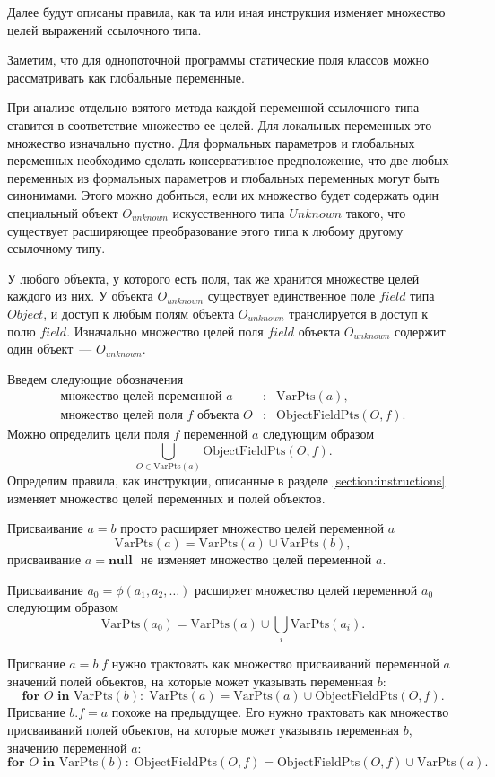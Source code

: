 \documentclass[14pt,titlepage]{extarticle}
\newcommand{\NULL}{\textbf{null }}
\newcommand{\VPts}[1]{\textrm{VarPts}(#1)}
\newcommand{\OFPts}[2]{\textrm{ObjectFieldPts}(#1, #2)}
\begin{document}
      Далее будут описаны правила, как та или иная инструкция изменяет
      множество целей выражений ссылочного типа.

      Заметим, что для однопоточной программы статические поля классов можно
      рассматривать как глобальные переменные.

      При анализе отдельно взятого метода каждой переменной ссылочного типа
      ставится в соответствие множество ее целей. Для локальных переменных
      это множество изначально пустно. Для формальных параметров и глобальных
      переменных необходимо сделать консервативное предположение, что две любых
      переменных из формальных параметров и глобальных переменных могут быть
      синонимами. Этого можно добиться, если их множество будет содержать один
      специальный объект $O_{unknown}$ искусственного типа $Unknown$ такого,
      что существует расширяющее преобразование этого типа к любому другому
      ссылочному типу.

      У любого объекта, у которого есть поля, так же хранится множестве целей
      каждого из них. У объекта $O_{unknown}$ существует единственное поле
      $field$ типа $Object$, и доступ к любым полям объекта $O_{unknown}$
      транслируется в доступ к полю $field$. Изначально множество целей
      поля $field$ объекта $O_{unknown}$ содержит один объект~---
      $O_{unknown}$.

      Введем следующие обозначения
      \begin{eqnarray*}
        \textrm{множество целей переменной $a$}&:& \VPts{a}, \\
        \textrm{множество целей поля $f$ объекта $O$}&:& \OFPts{O}{f}.
      \end{eqnarray*}
      Можно определить цели поля $f$ переменной $a$ следующим образом
      \[ \bigcup\limits_{O \in \VPts{a}} \OFPts{O}{f}.\]
      Определим правила, как инструкции, описанные в разделе
      \ref{section:instructions} изменяет множество целей переменных и полей
      объектов.

      Присваивание $a = b$ просто расширяет множество целей переменной $a$
      \[\VPts{a} = \VPts{a} \cup \VPts{b},\]
      присваивание $a = \NULL$ не изменяет множество целей переменной $a$.

      Присваивание $a_0 = \phi(a_1, a_2, \ldots)$ расширяет множество целей
      переменной $a_0$ следующим образом
      \[\VPts{a_0} = \VPts{a} \cup \bigcup\limits_{i} \VPts{a_i}.\]

      Присвание $a = b.f$ нужно трактовать как множество присваиваний
      переменной $a$ значений полей объектов, на которые может указывать переменная
      $b$:
      \[
        \textbf{for } O \textbf{ in } \VPts{b} \colon
        \; \VPts{a} = \VPts{a} \cup \OFPts{O}{f}.
      \]
      Присвание $b.f = a$ похоже на предыдущее. Его нужно трактовать как
      множество присваиваний полей объектов, на которые может указывать
      переменная $b$, значению переменной $a$:
      \[
        \textbf{for } O \textbf{ in } \VPts{b} \colon
        \; \OFPts{O}{f} = \OFPts{O}{f} \cup \VPts{a}.
      \]
\end{document}
